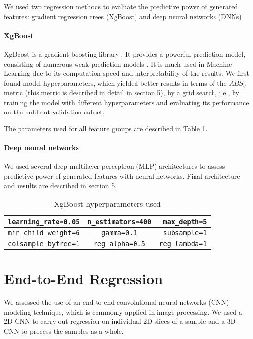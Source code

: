 \documentclass[review]{elsarticle}
\begin{document}
We used two regression methods to evaluate the predictive power of generated features: gradient regression trees (XgBoost) and deep neural networks (DNNs)
    
\paragraph{XgBoost}

XgBoost is a gradient boosting library \cite{xgboost}. It provides a powerful prediction model, consisting of numerous weak prediction models \cite{chen2016xgboost}. It is much used in Machine Learning due to its computation speed and interpretability of the results. We first found model hyperparameters, which yielded better results in terms of the $ABS_q$ metric (this metric is described in detail in section 5), by a grid search, i.e., by training the model with different hyperparameters and evaluating its performance on the hold-out validation subset.

The parameters used for all feature groups are described in Table 1.
    
\paragraph{Deep neural networks}

We used several deep multilayer perceptron (MLP) architectures to assess predictive power of generated features with neural networks. Final architecture and results are described in section 5.
    
\begin{table}[H]
  \centering
  \caption{XgBoost hyperparameters used} \label{tab:tab2}
  \begin{tabular}{ | l | c | r |}
    \hline
    \verb|learning_rate=0.05| & \verb|n_estimators=400| &  \verb|max_depth=5| \\ \hline
    \verb|min_child_weight=6| & \verb|gamma=0.1| & \verb|subsample=1| \\ \hline
    \verb|colsample_bytree=1| & \verb|reg_alpha=0.5| & \verb|reg_lambda=1| \\ \hline
  \end{tabular}
\end{table}

\section{End-to-End Regression}

We assessed the use of an end-to-end convolutional neural networks (CNN) modeling technique, which is commonly applied in image processing. We used a 2D CNN to carry out regression on individual 2D slices of a sample and a 3D CNN to process the samples as a whole.
\end{document}
